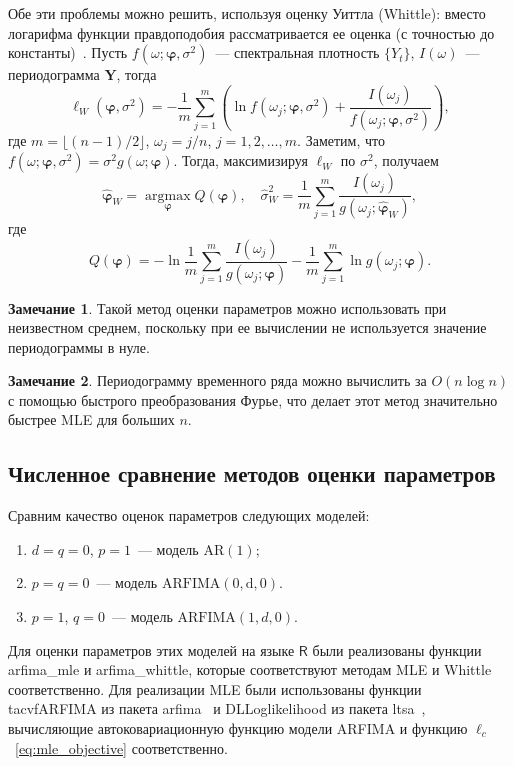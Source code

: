 \documentclass[specialist,
substylefile = spbu_report.rtx,
subf,href,colorlinks=true, 12pt]{disser}
\theoremstyle{definition}
\newtheorem{remark}{Замечание}[chapter]
\begin{document}
Обе эти проблемы можно решить, используя оценку Уиттла (Whittle): вместо логарифма функции правдоподобия рассматривается ее оценка (с точностью до константы)~\cite{Whittle1953}. Пусть $f(\omega; \bm\varphi, \sigma^2)$~--- спектральная плотность $\{Y_t\}$, $I(\omega)$~--- периодограмма $\bm Y$, тогда
\[
	\ell_W(\bm\varphi, \sigma^2)=-\frac1m\sum_{j=1}^m\left(\ln f(\omega_j; \bm\varphi, \sigma^2) + \frac{I(\omega_j)}{f(\omega_j; \bm\varphi, \sigma^2)}\right),
\]
где $m=\lfloor(n-1)/2\rfloor$, $\omega_j = j / n$, $j=1,2,\ldots,m$. Заметим, что $f(\omega; \bm\varphi, \sigma^2)=\sigma^2 g(\omega; \bm\varphi)$. Тогда, максимизируя $\ell_W$ по $\sigma^2$, получаем
\[
	\widehat{\bm\varphi}_W = \operatorname*{argmax}_{\bm\varphi}Q(\bm\varphi),\quad \widehat\sigma_W^2=\frac1m \sum_{j=1}^m\frac{I(\omega_j)}{g(\omega_j; \widehat{\bm\varphi}_W)},
\]
где
\[
	Q(\bm\varphi)=-\ln\frac1m \sum_{j=1}^m\frac{I(\omega_j)}{g(\omega_j; \bm\varphi)} - \frac1m \sum_{j=1}^m\ln g(\omega_j; \bm\varphi).
\]
\begin{remark}
	Такой метод оценки параметров можно использовать при неизвестном среднем, поскольку при ее вычислении не используется значение периодограммы в нуле.
\end{remark}
\begin{remark}
	Периодограмму временного ряда можно вычислить за $O(n\log n)$ с помощью быстрого преобразования Фурье, что делает этот метод значительно быстрее MLE для больших $n$.
\end{remark}
\subsection{Численное сравнение методов оценки параметров}\label{sect:est_param}
Сравним качество оценок параметров следующих моделей:
\begin{enumerate}
	\item $d=q=0$, $p=1$~--- модель $\mathrm{AR}(1)$;
	\item $p=q=0$~--- модель $\mathrm{ARFIMA(0, d, 0)}$.
	\item $p=1$, $q=0$~--- модель $\mathrm{ARFIMA}(1, d, 0)$.
\end{enumerate}
Для оценки параметров этих моделей на языке $\mathsf{R}$ были реализованы функции \textsf{arfima\_mle} и \textsf{arfima\_whittle}, которые соответствуют методам MLE и Whittle соответственно. Для реализации MLE были использованы функции \textsf{tacvfARFIMA} из пакета \textsf{arfima}~\cite{Veenstra2012} и \textsf{DLLoglikelihood} из пакета \textsf{ltsa}~\cite{McLeod2007}, вычисляющие автоковариационную функцию модели ARFIMA и функцию $\ell_c$~\eqref{eq:mle_objective} соответственно.
\end{document}
